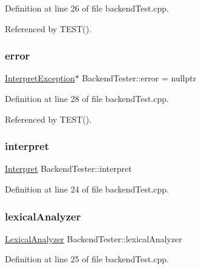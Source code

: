 Definition at line 26 of file backend\+Test.\+cpp.



Referenced by T\+E\+S\+T().

\mbox{\label{class_backend_tester_a8b8308a2c21881f287a49951792b2e0d}} 
\subsubsection{\texorpdfstring{error}{error}}
{\footnotesize\ttfamily \hyperlink{class_interpret_exception}{Interpret\+Exception}$\ast$ Backend\+Tester\+::error = nullptr}



Definition at line 28 of file backend\+Test.\+cpp.



Referenced by T\+E\+S\+T().

\mbox{\label{class_backend_tester_ae033438ca3f49eeb6f1f8932fd17b717}} 
\subsubsection{\texorpdfstring{interpret}{interpret}}
{\footnotesize\ttfamily \hyperlink{classteam22_1_1_calc_1_1_interpret}{Interpret} Backend\+Tester\+::interpret}



Definition at line 24 of file backend\+Test.\+cpp.

\mbox{\label{class_backend_tester_a7dd738e95d26936889aefa439540698d}} 
\subsubsection{\texorpdfstring{lexical\+Analyzer}{lexicalAnalyzer}}
{\footnotesize\ttfamily \hyperlink{classteam22_1_1_calc_1_1_lexical_analyzer}{Lexical\+Analyzer} Backend\+Tester\+::lexical\+Analyzer}



Definition at line 25 of file backend\+Test.\+cpp.

